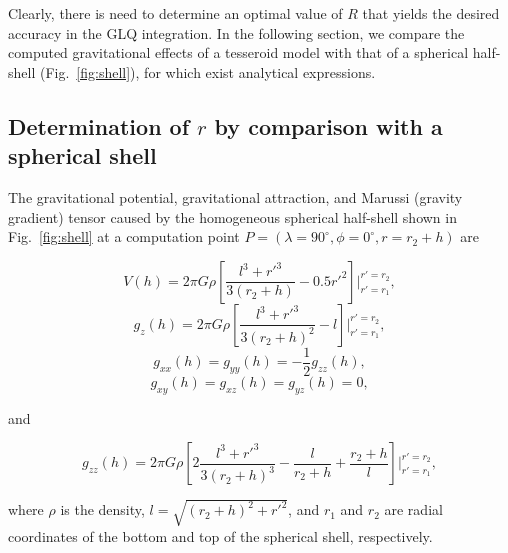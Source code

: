 \documentclass[extra]{gji}
\begin{document}
Clearly,
there is need to determine
an optimal value of $R$
that yields the desired accuracy
in the GLQ integration.
In the following section,
we compare the computed gravitational effects
of a tesseroid model
with that of a spherical half-shell
(Fig.~\ref{fig:shell}),
for which exist analytical expressions.


\subsection{Determination of $r$ by comparison with a spherical shell}

The gravitational potential,
gravitational attraction,
and
Marussi (gravity gradient) tensor
caused by the homogeneous spherical half-shell
shown in Fig.~\ref{fig:shell}
at a computation point
$P = (\lambda=90^\circ, \phi=0^\circ, r=r_2+h)$
are

\begin{equation}
    V(h) = 2\pi G \rho \left[
        \frac{l^3 + {r'}^3}{3(r_2 + h)} - 0.5 {r'}^2 \right]
         \Biggr|_{r'=r_1}^{r'=r_2},
    \label{eq:shellpot}
\end{equation}
\begin{equation}
    g_z(h) = 2\pi G \rho \left[
        \frac{l^3 + {r'}^3}{3(r_2 + h)^2} - l \right]
        \Biggr|_{r'=r_1}^{r'=r_2},
    \label{eq:shellgz}
\end{equation}
\begin{equation}
    g_{xx}(h) = g_{yy}(h) = -\frac{1}{2} g_{zz}(h),
\end{equation}
\begin{equation}
    g_{xy}(h) = g_{xz}(h) = g_{yz}(h) = 0,
\end{equation}

\noindent
and

\begin{equation}
    g_{zz}(h) = 2\pi G \rho \left[
        2\frac{l^3 + {r'}^3}{3(r_2 + h)^3}
        - \frac{l}{r_2 + h} + \frac{r_2 + h}{l}
        \right]
        \Biggr|_{r'=r_1}^{r'=r_2},
    \label{eq:shellgzz}
\end{equation}

\noindent
where $\rho$ is the density,
$l = \sqrt{(r_2 + h)^2 + {r'}^2}$,
and
$r_1$ and $r_2$ are radial coordinates of
the bottom and top of the spherical shell,
respectively.
\end{document}
